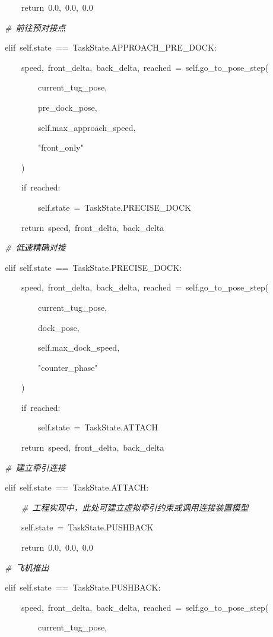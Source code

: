 ~~~~~~~~~~~~return~0.0,~0.0,~0.0

~~~~~~~~\emph{\#~前往预对接点}

~~~~~~~~elif~self.state~==~TaskState.APPROACH\_PRE\_DOCK:

~~~~~~~~~~~~speed,~front\_delta,~back\_delta,~reached~=~self.go\_to\_pose\_step(

~~~~~~~~~~~~~~~~current\_tug\_pose,

~~~~~~~~~~~~~~~~pre\_dock\_pose,

~~~~~~~~~~~~~~~~self.max\_approach\_speed,

~~~~~~~~~~~~~~~~"front\_only"

~~~~~~~~~~~~)

~~~~~~~~~~~~if~reached:

~~~~~~~~~~~~~~~~self.state~=~TaskState.PRECISE\_DOCK

~~~~~~~~~~~~return~speed,~front\_delta,~back\_delta

~~~~~~~~\emph{\#~低速精确对接}

~~~~~~~~elif~self.state~==~TaskState.PRECISE\_DOCK:

~~~~~~~~~~~~speed,~front\_delta,~back\_delta,~reached~=~self.go\_to\_pose\_step(

~~~~~~~~~~~~~~~~current\_tug\_pose,

~~~~~~~~~~~~~~~~dock\_pose,

~~~~~~~~~~~~~~~~self.max\_dock\_speed,

~~~~~~~~~~~~~~~~"counter\_phase"

~~~~~~~~~~~~)

~~~~~~~~~~~~if~reached:

~~~~~~~~~~~~~~~~self.state~=~TaskState.ATTACH

~~~~~~~~~~~~return~speed,~front\_delta,~back\_delta

~~~~~~~~\emph{\#~建立牵引连接}

~~~~~~~~elif~self.state~==~TaskState.ATTACH:

~~~~~~~~~~~~\emph{\#~工程实现中，此处可建立虚拟牵引约束或调用连接装置模型}

~~~~~~~~~~~~self.state~=~TaskState.PUSHBACK

~~~~~~~~~~~~return~0.0,~0.0,~0.0

~~~~~~~~\emph{\#~飞机推出}

~~~~~~~~elif~self.state~==~TaskState.PUSHBACK:

~~~~~~~~~~~~speed,~front\_delta,~back\_delta,~reached~=~self.go\_to\_pose\_step(

~~~~~~~~~~~~~~~~current\_tug\_pose,

